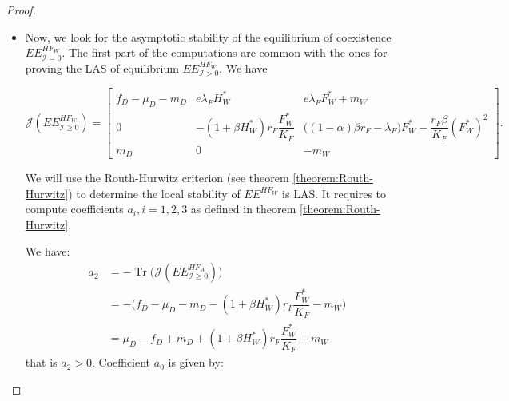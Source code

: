 \documentclass{article}
\newcommand{\lfw}{\lambda_{F}}
\newcommand{\lfw}{\lambda_{F}}
\newcommand{\cI}{\mathcal{I}}
\DeclareMathOperator{\Tr}{Tr}
\begin{document}
\begin{proof}
\begin{itemize}
\item Now, we look for the asymptotic stability of the equilibrium of coexistence $EE^{HF_W}_{\cI=0}$. The first part of the computations are common with the ones for proving the LAS of equilibrium $EE^{HF_W}_{\cI >0}$.
We have


\begin{equation*}
\mathcal{J}(EE^{H F_W}_{\cI \geq 0}) = \begin{bmatrix}
f_D -\mu_D - m_D & e \lfw H_W^* & e \lfw F^*_W +m_W \\
0 & -(1 + \beta H_W^*)r_F \dfrac{F_W^*}{K_F} & \big( (1-\alpha)\beta r_F - \lfw \big) F_W^* -  \dfrac{r_F\beta}{K_F} (F_W^*)^2 \\
m_D & 0 & -m_W
\end{bmatrix}.
\end{equation*} 


We will use the Routh-Hurwitz criterion (see theorem \ref{theorem:Routh-Hurwitz}) to determine the local stability of $EE^{H F_W}$ is LAS. It requires to compute coefficients $a_i, i =1,2,3$ as defined in theorem \ref{theorem:Routh-Hurwitz}.

We have:
\begin{subequations}
\begin{align}
a_2 &= - \Tr\Big(\mathcal{J}(EE^{H F_W}_{\cI \geq 0})\Big) \\
 &= -\Big(f_D - \mu_D - m_D - (1+\beta H_W^*)r_F \dfrac{F_W^*}{K_F} - m_W\Big) \\
 &= \mu_D - f_D + m_D + (1+\beta H_W^*)r_F \dfrac{F_W^*}{K_F} + m_W
 \label{equation:coefficient a2}
\end{align}
\end{subequations}
that is $a_2>0$. Coefficient $a_0$ is given by:


\end{itemize}
\end{proof}
\end{document}

